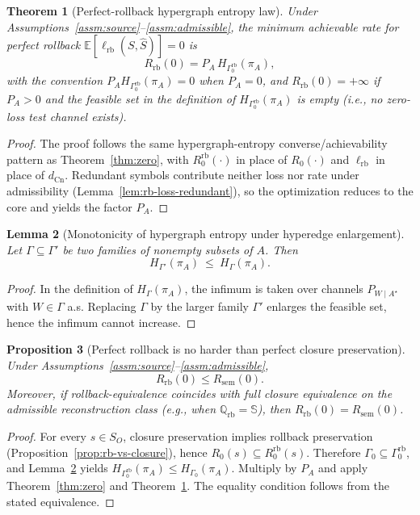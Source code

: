 \documentclass[twoside]{article}
\newtheorem{theorem}{Theorem}[section]
\newtheorem{lemma}[theorem]{Lemma}
\newtheorem{proposition}[theorem]{Proposition}
\newcommand{\Cn}{\mathrm{Cn}}
\newcommand{\sem}{\mathrm{sem}}
\newcommand{\E}{\mathbb{E}}
\newcommand{\1}{\mathbf{1}}
\begin{document}
\begin{theorem}[Perfect-rollback hypergraph entropy law]
\label{thm:rb-zero-hypergraph}
Under Assumptions~\ref{assm:source}--\ref{assm:admissible}, the minimum achievable rate for
\emph{perfect rollback} \(\E[\ell_{\mathrm{rb}}(S,\hat S)]=0\) is
\[
R_{\mathrm{rb}}(0)=P_A\,H_{\Gamma^{\mathrm{rb}}_0}(\pi_A),
\]
with the convention \(P_A H_{\Gamma^{\mathrm{rb}}_0}(\pi_A)=0\) when \(P_A=0\), and
\(R_{\mathrm{rb}}(0)=+\infty\) if \(P_A>0\) and the feasible set in the definition of
\(H_{\Gamma^{\mathrm{rb}}_0}(\pi_A)\) is empty (i.e., no zero-loss test channel exists).
\end{theorem}

\begin{proof}
The proof follows the same hypergraph-entropy converse/achievability pattern as Theorem~\ref{thm:zero},
with \(R^{\mathrm{rb}}_0(\cdot)\) in place of \(R_0(\cdot)\) and \(\ell_{\mathrm{rb}}\) in place of \(d_{\Cn}\).
Redundant symbols contribute neither loss nor rate under admissibility (Lemma~\ref{lem:rb-loss-redundant}),
so the optimization reduces to the core and yields the factor \(P_A\).
\end{proof}

\begin{lemma}[Monotonicity of hypergraph entropy under hyperedge enlargement]
\label{lem:hypergraph-entropy-monotone}
Let \(\Gamma\subseteq \Gamma'\) be two families of nonempty subsets of \(A\). Then
\[
H_{\Gamma'}(\pi_A)\ \le\ H_{\Gamma}(\pi_A).
\]
\end{lemma}
\begin{proof}
In the definition of \(H_{\Gamma}(\pi_A)\), the infimum is taken over channels \(P_{W\mid A^\star}\) with \(W\in\Gamma\) a.s.
Replacing \(\Gamma\) by the larger family \(\Gamma'\) enlarges the feasible set, hence the infimum cannot increase.
\end{proof}

\begin{proposition}[Perfect rollback is no harder than perfect closure preservation]
\label{prop:rb-vs-sem-zero}
Under Assumptions~\ref{assm:source}--\ref{assm:admissible},
\[
R_{\mathrm{rb}}(0)\le R_{\sem}(0).
\]
Moreover, if rollback-equivalence coincides with full closure equivalence on the admissible reconstruction class
(e.g., when \(\mathbb Q_{\mathrm{rb}}=\mathbb{S}\)), then \(R_{\mathrm{rb}}(0)=R_{\sem}(0)\).
\end{proposition}

\begin{proof}
For every \(s\in S_O\), closure preservation implies rollback preservation (Proposition~\ref{prop:rb-vs-closure}), hence
\(R_0(s)\subseteq R^{\mathrm{rb}}_0(s)\). Therefore \(\Gamma_0\subseteq \Gamma^{\mathrm{rb}}_0\), and
Lemma~\ref{lem:hypergraph-entropy-monotone} yields \(H_{\Gamma^{\mathrm{rb}}_0}(\pi_A)\le H_{\Gamma_0}(\pi_A)\).
Multiply by \(P_A\) and apply Theorem~\ref{thm:zero} and Theorem~\ref{thm:rb-zero-hypergraph}.
The equality condition follows from the stated equivalence.
\end{proof}
\end{document}
